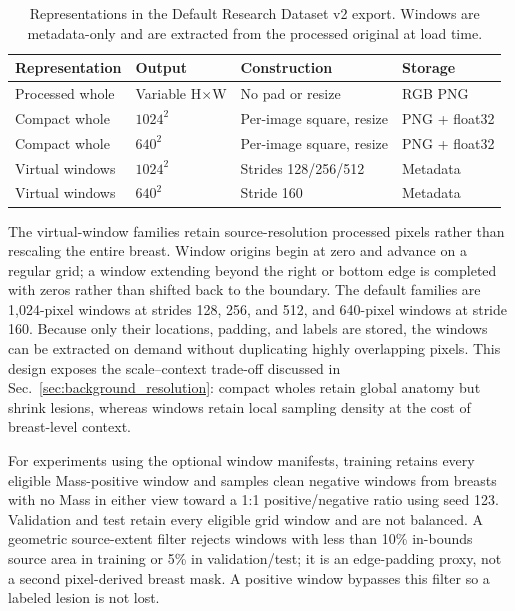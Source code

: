 \begin{table}[t]
\centering
\caption{Representations in the Default Research Dataset v2 export.  Windows
are metadata-only and are extracted from the processed original at load time.}
\label{tab:dataset_resolution_ladder}
\scriptsize
\setlength{\tabcolsep}{3.2pt}
\begin{tabularx}{\columnwidth}{@{}llXl@{}}
\toprule
Representation & Output & Construction & Storage \\
\midrule
Processed whole & Variable H$\times$W & No pad or resize & RGB PNG \\
Compact whole & $1024^2$ & Per-image square, resize & PNG + float32 \\
Compact whole & $640^2$ & Per-image square, resize & PNG + float32 \\
Virtual windows & $1024^2$ & Strides 128/256/512 & Metadata \\
Virtual windows & $640^2$ & Stride 160 & Metadata \\
\bottomrule
\end{tabularx}
\end{table}

The virtual-window families retain source-resolution processed pixels rather
than rescaling the entire breast.  Window origins begin at zero and advance on
a regular grid; a window extending beyond the right or bottom edge is completed
with zeros rather than shifted back to the boundary.  The default families are
1,024-pixel windows at strides 128, 256, and 512, and 640-pixel windows at
stride 160.  Because only their locations, padding, and labels are stored, the
windows can be extracted on demand without duplicating highly overlapping
pixels.  This design exposes the scale--context trade-off discussed in
Sec.~\ref{sec:background_resolution}: compact wholes retain global anatomy but
shrink lesions, whereas windows retain local sampling density at the cost of
breast-level context.

For experiments using the optional window manifests, training retains every
eligible Mass-positive window and samples clean negative windows from breasts
with no Mass in either view toward a 1:1 positive/negative ratio using seed 123.
Validation and test retain every eligible grid window and are not balanced.  A
geometric source-extent filter rejects windows with less than 10\% in-bounds
source area in training or 5\% in validation/test; it is an edge-padding proxy,
not a second pixel-derived breast mask.  A positive window bypasses this filter
so a labeled lesion is not lost.

